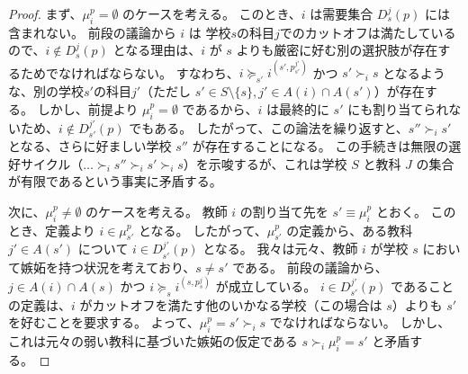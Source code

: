 \documentclass[12pt, a4paper]{article}
\theoremstyle{definition}
\theoremstyle{remark}
\theoremstyle{plain}
\begin{document}
\begin{proof}
まず、\( \mu_i^p = \emptyset \) のケースを考える。
このとき、\( i \) は需要集合 \( D_s^j(p) \) には含まれない。
前段の議論から \( i \) は 学校$s$の科目$j$でのカットオフは満たしているので、\( i \notin D_s^j(p) \) となる理由は、\( i \) が \( s \) よりも厳密に好む別の選択肢が存在するためでなければならない。
すなわち、\( i \succeq_{s'} i^{(s',p^{j'}_{s'})} \) かつ \( s' \succ_i s \) となるような、別の学校$s'$の科目$j'$（ただし \( s' \in S\setminus \{s\}, j' \in A(i) \cap A(s') \)）が存在する。
しかし、前提より \( \mu_i^p = \emptyset \) であるから、\( i \) は最終的に \( s' \) にも割り当てられないため、\( i \notin D_{s'}^{j'}(p) \) でもある。
したがって、この論法を繰り返すと、\( s'' \succ_i s' \) となる、さらに好ましい学校 \( s'' \) が存在することになる。
この手続きは無限の選好サイクル（\( \dots \succ_i s'' \succ_i s' \succ_i s \)）を示唆するが、これは学校 \( S \) と教科 \( J \) の集合が有限であるという事実に矛盾する。


  

次に、\( \mu_i^p \neq \emptyset \) のケースを考える。
教師 \( i \) の割り当て先を \( s' \equiv \mu_i^p \) とおく。
このとき、定義より \( i \in \mu_{s'}^p \) となる。
したがって、\( \mu_{s'}^p \) の定義から、ある教科 \( j' \in A(s') \) について \( i \in D_{s'}^{j'}(p) \) となる。
我々は元々、教師 \( i \) が学校 \( s \) において嫉妬を持つ状況を考えており、\( s \neq s' \) である。
前段の議論から、\( j \in A(i) \cap A(s) \) かつ \( i \succeq_{s} i^{(s,p_{s}^j)} \) が成立している。
\( i \in D_{s'}^{j'}(p) \) であることの定義は、\( i \) がカットオフを満たす他のいかなる学校（この場合は \(s\)）よりも \( s' \) を好むことを要求する。
よって、\( \mu_i^p = s' \succ_i s \) でなければならない。
しかし、これは元々の弱い教科に基づいた嫉妬の仮定である \( s \succ_i \mu_i^p = s' \) と矛盾する。
\end{proof}



\end{document}
